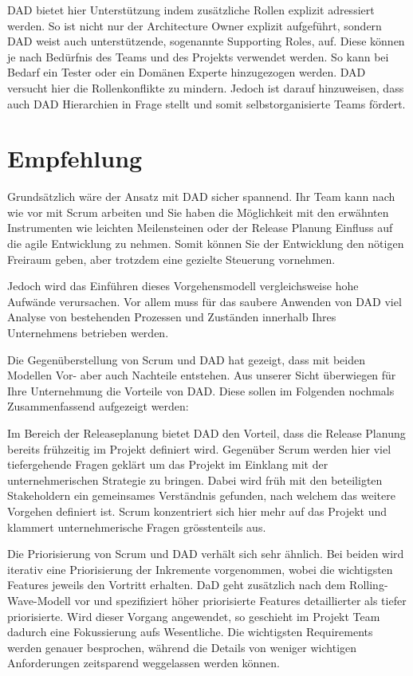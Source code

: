 DAD bietet hier Unterstützung indem zusätzliche Rollen explizit adressiert werden. So ist nicht nur der Architecture Owner explizit aufgeführt, sondern DAD weist auch unterstützende, sogenannte Supporting Roles, auf. Diese können je nach Bedürfnis des Teams und des Projekts verwendet werden. So kann bei Bedarf ein Tester oder ein Domänen Experte hinzugezogen werden. DAD versucht hier die Rollenkonflikte zu mindern. Jedoch ist darauf hinzuweisen, dass auch DAD Hierarchien in Frage stellt und somit selbstorganisierte Teams fördert.



\section{Empfehlung}

Grundsätzlich wäre der Ansatz mit DAD sicher spannend. Ihr Team kann nach wie vor mit Scrum arbeiten und Sie haben die Möglichkeit mit den erwähnten Instrumenten wie leichten Meilensteinen oder der Release Planung Einfluss auf die agile Entwicklung zu nehmen. Somit können Sie der Entwicklung den nötigen Freiraum geben, aber trotzdem eine gezielte Steuerung vornehmen.

Jedoch wird das Einführen dieses Vorgehensmodell vergleichsweise hohe Aufwände verursachen. Vor allem muss für das saubere Anwenden von DAD viel Analyse von bestehenden Prozessen und Zuständen innerhalb Ihres Unternehmens betrieben werden.

Die Gegenüberstellung von Scrum und DAD hat gezeigt, dass mit beiden Modellen Vor- aber auch Nachteile entstehen. Aus unserer Sicht überwiegen für Ihre Unternehmung die Vorteile von DAD. Diese sollen im Folgenden nochmals Zusammenfassend aufgezeigt werden:

Im Bereich der Releaseplanung bietet DAD den Vorteil, dass die Release Planung bereits frühzeitig im Projekt definiert wird. Gegenüber Scrum werden hier viel tiefergehende Fragen geklärt um das Projekt im Einklang mit der unternehmerischen Strategie zu bringen. Dabei wird früh mit den beteiligten Stakeholdern ein gemeinsames Verständnis gefunden, nach welchem das weitere Vorgehen definiert ist. Scrum konzentriert sich hier mehr auf das Projekt und klammert unternehmerische Fragen grösstenteils aus.

Die Priorisierung von Scrum und DAD verhält sich sehr ähnlich. Bei beiden wird iterativ eine Priorisierung der Inkremente vorgenommen, wobei die wichtigsten Features jeweils den Vortritt erhalten. DaD geht zusätzlich nach dem Rolling-Wave-Modell vor und spezifiziert höher priorisierte Features detaillierter als tiefer priorisierte. Wird dieser Vorgang angewendet, so geschieht im Projekt Team dadurch eine Fokussierung aufs Wesentliche. Die wichtigsten Requirements werden genauer besprochen, während die Details von weniger wichtigen Anforderungen zeitsparend weggelassen werden können.

